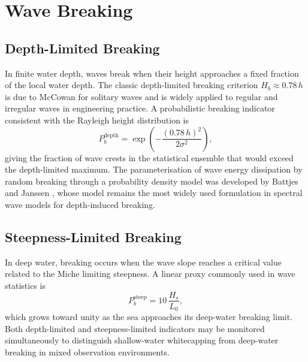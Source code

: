 \documentclass[journal]{IEEEtran}
\begin{document}
    \section{Wave Breaking}
    \label{sec:breaking}

    \subsection{Depth-Limited Breaking}

    In finite water depth, waves break when their height approaches a
    fixed fraction of the local water depth.
    The classic depth-limited breaking criterion
    $H_b \approx 0.78\,h$ is due to McCowan \cite{McCowan1894} for
    solitary waves and is widely applied to regular and irregular waves
    in engineering practice.
    A probabilistic breaking indicator consistent with the Rayleigh
    height distribution is
    \begin{equation}
        P_b^\mathrm{depth} = \exp\!\left(-\frac{(0.78\,h)^2}{2\sigma^2}\right),
    \end{equation}
    giving the fraction of wave crests in the statistical ensemble that
    would exceed the depth-limited maximum.
    The parameterisation of wave energy dissipation by random breaking
    through a probability density model was developed by Battjes and
    Janssen \cite{Battjes1978}, whose model remains the most widely used
    formulation in spectral wave models for depth-induced breaking.

    \subsection{Steepness-Limited Breaking}

    In deep water, breaking occurs when the wave slope reaches a critical
    value related to the Miche limiting steepness.
    A linear proxy commonly used in wave statistics is
    \begin{equation}
        P_b^\mathrm{steep} = 10\,\frac{H_s}{L_0},
    \end{equation}
    which grows toward unity as the sea approaches its deep-water breaking
    limit.
    Both depth-limited and steepness-limited indicators may be monitored
    simultaneously to distinguish shallow-water whitecapping from
    deep-water breaking in mixed observation environments.

\end{document}
